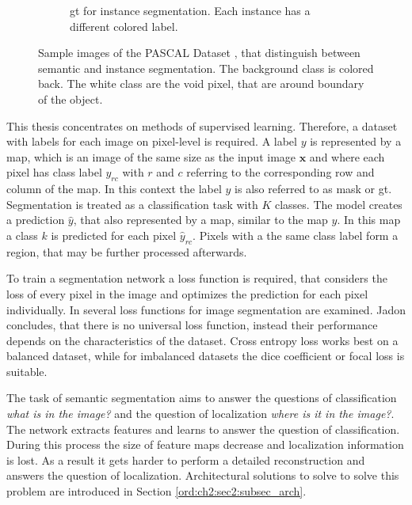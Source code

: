 \begin{figure} [h]
\begin{subfigure}[t]{0.3\textwidth}
		\caption{
			\gls{gt} for instance segmentation.
			Each instance has a different colored label.
		}\label{fig:ch2:sec3:instance_seg}
	\end{subfigure}
	\caption[Semantic and instance segmentation]{
		Sample images of the PASCAL  Dataset \cite{Eve20-PascalVOC}, that distinguish between semantic and instance segmentation.
		The background class is colored back.
		The white class are the void pixel, that are around boundary of the object.
	}\label{fig:ch2:sec2:segmentation_image}
\end{figure}

This thesis concentrates on methods of supervised learning.
Therefore, a dataset with labels for each image on pixel-level is required.
A label $y$ is represented by a map, which is an image of the same size as the input image $\textbf{x}$ and where each pixel has class label $y_{rc}$ with $r$ and $c$ referring to the corresponding row and column of the map. 
In this context the label $y$ is also referred to as mask or \gls{gt}.
Segmentation is treated as a classification task with $K$ classes.
The model creates a prediction $\hat{y}$, that also represented by a map, similar to the map $y$.
In this map a class $k$ is predicted for each pixel $\hat{y}_{rc}$.
Pixels with a the same class label form a region, that may be further processed afterwards.

To train a segmentation network a loss function is required, that considers the loss of every pixel in the image and optimizes the prediction for each pixel individually.
In \cite{Jad20-LossFunction} several loss functions for image segmentation are examined.
Jadon concludes, that there is no universal loss function, instead their performance depends on the characteristics of the dataset.
Cross entropy loss works best on a balanced dataset, while for imbalanced datasets the dice coefficient or focal loss is suitable.

The task of semantic segmentation aims to answer the questions of classification \emph{what is in the image?} and the question of localization \emph{where is it in the image?}.
The network extracts features and learns to answer the question of classification.
During this process the size of feature maps decrease and localization information is lost.
As a result it gets harder to perform a detailed reconstruction and answers the question of localization.
Architectural solutions to solve to solve this problem are introduced in Section \ref{ord:ch2:sec2:subsec_arch}.

